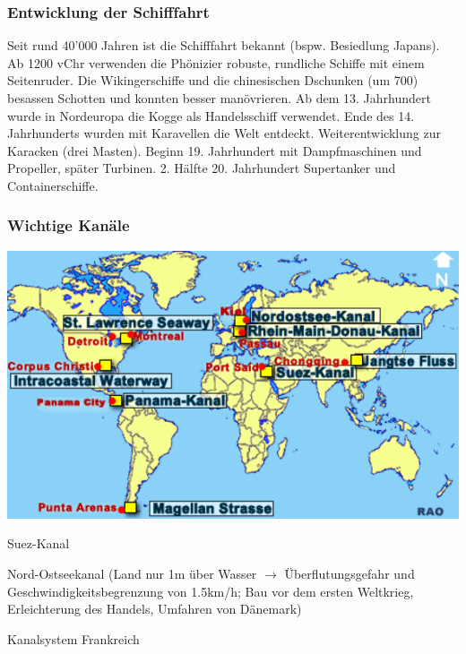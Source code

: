 \documentclass[10pt, openright=true]{scrartcl}
\begin{document}
\subsubsection{Entwicklung der Schifffahrt}
Seit rund 40’000 Jahren ist die Schifffahrt bekannt (bspw. Besiedlung Japans). Ab 1200 vChr verwenden die Phönizier robuste, rundliche Schiffe mit einem Seitenruder. Die Wikingerschiffe und die chinesischen Dschunken (um 700) besassen Schotten und konnten besser manövrieren. Ab dem 13. Jahrhundert wurde in Nordeuropa die Kogge als Handelsschiff verwendet. Ende des 14. Jahrhunderts wurden mit Karavellen die Welt entdeckt. Weiterentwicklung zur Karacken (drei Masten). Beginn 19. Jahrhundert mit Dampfmaschinen und Propeller, später Turbinen. 2. Hälfte 20. Jahrhundert Supertanker und Containerschiffe.
\subsubsection{Wichtige Kanäle}
\includegraphics[width=.65\textwidth]{images/kanal}
\begin{citemize}
\item Suez-Kanal
\item Nord-Ostseekanal (Land nur 1m über Wasser $ \rightarrow $ Überflutungsgefahr und Geschwindigkeitsbegrenzung von 1.5km/h; Bau vor dem ersten Weltkrieg, Erleichterung des Handels, Umfahren von Dänemark)
\item Kanalsystem Frankreich
\end{citemize}
\end{document}
